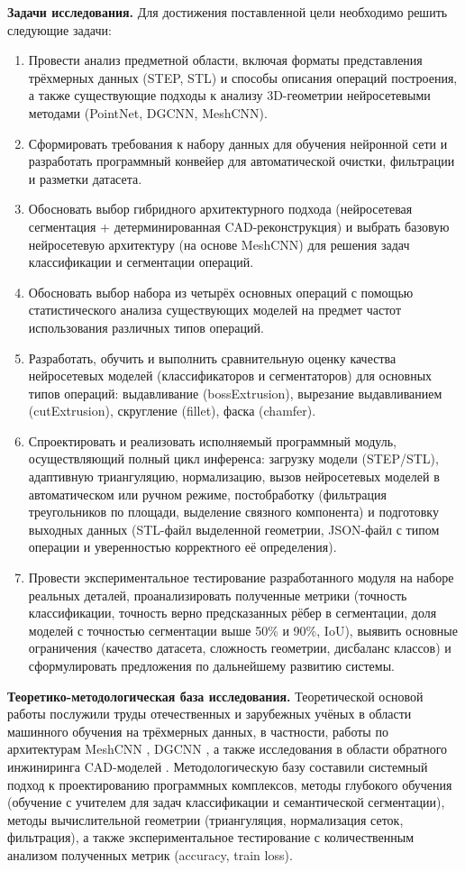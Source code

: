 \textbf{Задачи исследования.} Для достижения поставленной цели необходимо решить следующие задачи:
\begin{enumerate}
    \item Провести анализ предметной области, включая форматы представления трёхмерных данных (STEP, STL) и способы описания операций построения, а также существующие подходы к анализу 3D-геометрии нейросетевыми методами (PointNet, DGCNN, MeshCNN).
    \item Сформировать требования к набору данных для обучения нейронной сети и разработать программный конвейер для автоматической очистки, фильтрации и разметки датасета.
    \item Обосновать выбор гибридного архитектурного подхода (нейросетевая сегментация + детерминированная CAD-реконструкция) и выбрать базовую нейросетевую архитектуру (на основе MeshCNN) для решения задач классификации и сегментации операций.
    \item Обосновать выбор набора из четырёх основных операций с помощью статистического анализа существующих моделей на предмет частот использования различных типов операций.
    \item Разработать, обучить и выполнить сравнительную оценку качества нейросетевых моделей (классификаторов и сегментаторов) для основных типов операций: выдавливание (bossExtrusion), вырезание выдавливанием (cutExtrusion), скругление (fillet), фаска (chamfer).
    \item Спроектировать и реализовать исполняемый программный модуль, осуществляющий полный цикл инференса: загрузку модели (STEP/STL), адаптивную триангуляцию, нормализацию, вызов нейросетевых моделей в автоматическом или ручном режиме, постобработку (фильтрация треугольников по площади, выделение связного компонента) и подготовку выходных данных (STL-файл выделенной геометрии, JSON-файл с типом операции и уверенностью корректного её определения).
    \item Провести экспериментальное тестирование разработанного модуля на наборе реальных деталей, проанализировать полученные метрики (точность классификации, точность верно предсказанных рёбер в сегментации, доля моделей с точностью сегментации выше 50\% и 90\%, IoU), выявить основные ограничения (качество датасета, сложность геометрии, дисбаланс классов) и сформулировать предложения по дальнейшему развитию системы.
\end{enumerate}

\textbf{Теоретико-методологическая база исследования.} Теоретической основой работы послужили труды отечественных и зарубежных учёных в области машинного обучения на трёхмерных данных, в частности, работы по архитектурам MeshCNN \cite{meshcnn2019}, DGCNN \cite{zhang2023}, а также исследования в области обратного инжиниринга CAD-моделей \cite{interpolyaris2022}. Методологическую базу составили системный подход к проектированию программных комплексов, методы глубокого обучения (обучение с учителем для задач классификации и семантической сегментации), методы вычислительной геометрии (триангуляция, нормализация сеток, фильтрация), а также экспериментальное тестирование с количественным анализом полученных метрик (accuracy, train loss).

